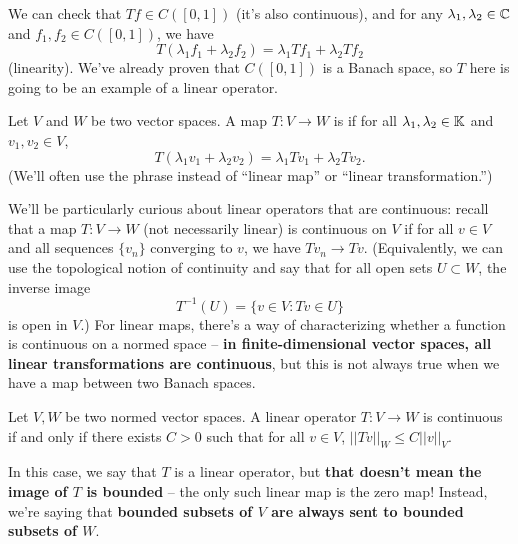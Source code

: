 We can check that $Tf \in C([0, 1])$ (it's also continuous), and for any $\lambda_1, \lambda_2 \in \mathbb C$ and $f_1, f_2 \in C([0, 1])$, we have 
\[
    T(\lambda_1 f_1 + \lambda_2 f_2) = \lambda_1 Tf_1 + \lambda_2 Tf_2
\]
(linearity). We've already proven that $C([0, 1])$ is a Banach space, so $T$ here is going to be an example of a linear operator. 

\begin{definition}
Let $V$ and $W$ be two vector spaces. A map $T: V \to W$ is  if for all $\lambda_1, \lambda_2 \in \mathbb K$ and $v_1, v_2 \in V$, 
\[
    T(\lambda_1v_1 + \lambda_2v_2) = \lambda_1 Tv_1 + \lambda_2 Tv_2.
\]
(We'll often use the phrase  instead of ``linear map'' or ``linear transformation.'')
\end{definition}

We'll be particularly curious about linear operators that are continuous: recall that a map $T: V \to W$ (not necessarily linear) is continuous on $V$ if for all $v \in V$ and all sequences $\{v_n\}$ converging to $v$, we have $Tv_n \to Tv$. (Equivalently, we can use the topological notion of continuity and say that for all open sets $U \subset W$, the inverse image
\[
    T^{-1}(U) = \{v \in V: Tv \in U\}
\]
is open in $V$.) For linear maps, there's a way of characterizing whether a function is continuous on a normed space -- \textbf{in finite-dimensional vector spaces, all linear transformations are continuous}, but this is not always true when we have a map between two Banach spaces. 

\begin{theorem}
Let $V, W$ be two normed vector spaces. A linear operator $T: V \to W$ is continuous if and only if there exists $C > 0$ such that for all $v \in V$, $||Tv||_W \le C||v||_V$. 
\end{theorem}

In this case, we say that $T$ is a  linear operator, but \textbf{that doesn't mean the image of $T$ is bounded} -- the only such linear map is the zero map! Instead, we're saying that \textbf{bounded subsets of $V$ are always sent to bounded subsets of $W$}.

